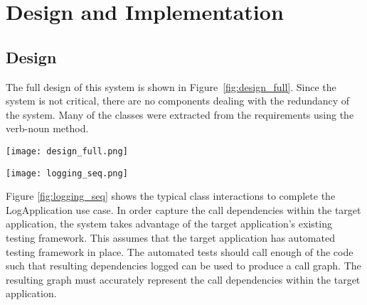 \chapter{Design and Implementation}
\label{chap:design}

\section{Design}
The full design of this system is shown in Figure~\ref{fig:design_full}. Since the system is not critical, there are no components dealing with the redundancy of the system. Many of the classes were extracted from the requirements using the verb-noun method.
\begin{center}
    \texttt{[image: design\_full.png]}
    \label{fig:design_full}
\end{center}

\begin{center}
    \texttt{[image: logging\_seq.png]}
    \label{fig:logging_seq}
\end{center}
Figure \ref{fig:logging_seq} shows the typical class interactions to complete the LogApplication use case. In order capture the call dependencies within the target application, the system takes advantage of the target application's existing testing framework. This assumes that the target application has automated testing framework in place. The automated tests should call enough of the code such that resulting dependencies logged can be used to produce a call graph. The resulting graph must accurately represent the call dependencies within the target application.

